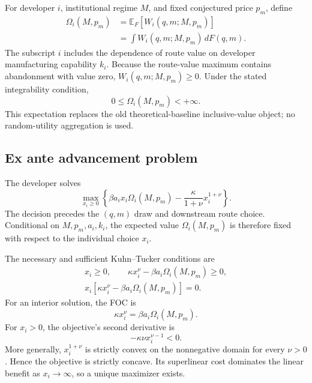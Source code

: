 For developer \(i\), institutional regime \(M\), and fixed conjectured price
\(p_m\), define
\begin{equation}
  \begin{aligned}
  \Omega_i(M,p_m)
  &=
  \mathbb E_F\!\left[
    W_i(q,m;M,p_m)
  \right]\\
  &=
  \int W_i(q,m;M,p_m)\,dF(q,m).
  \end{aligned}
  \label{eq:p05-expected-value}
\end{equation}
The subscript \(i\) includes the dependence of route value on developer
manufacturing capability \(k_i\). Because the
route-value maximum contains abandonment with value zero,
\(W_i(q,m;M,p_m)\geq0\). Under the stated integrability condition,
\[
  0\leq\Omega_i(M,p_m)<+\infty.
\]
This expectation replaces the old theoretical-baseline inclusive-value
object; no random-utility aggregation is used.

\subsection{Ex ante advancement problem}
\label{subsec:p05-problem}

The developer solves
\begin{equation}
  \max_{x_i\geq0}
  \left\{
    \beta a_ix_i\Omega_i(M,p_m)
    -
    \frac{\kappa}{1+\nu}x_i^{1+\nu}
  \right\}.
  \label{eq:p05-advancement-objective}
\end{equation}
The decision precedes the \((q,m)\) draw and downstream route choice.
Conditional on \(M,p_m,a_i,k_i\), the expected value
\(\Omega_i(M,p_m)\) is therefore fixed with respect to the individual
choice \(x_i\).

The necessary and sufficient Kuhn--Tucker conditions are
\begin{equation}
  \begin{gathered}
  x_i\geq0,\qquad
  \kappa x_i^\nu-\beta a_i\Omega_i(M,p_m)\geq0,\\
  x_i\left[
    \kappa x_i^\nu-\beta a_i\Omega_i(M,p_m)
  \right]=0.
  \end{gathered}
  \label{eq:p05-kkt}
\end{equation}
For an interior solution, the FOC is
\begin{equation}
  \kappa x_i^\nu
  =
  \beta a_i\Omega_i(M,p_m).
  \label{eq:p05-foc}
\end{equation}
For \(x_i>0\), the objective's second derivative is
\begin{equation}
  -\kappa\nu x_i^{\nu-1}<0.
  \label{eq:p05-soc}
\end{equation}
More generally, \(x_i^{1+\nu}\) is strictly convex on the nonnegative
domain for every \(\nu>0\). Hence the objective is strictly concave.
Its superlinear cost dominates the linear benefit as \(x_i\to\infty\), so a
unique maximizer exists.

